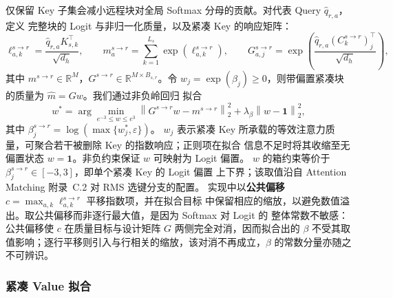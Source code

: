 \documentclass[sigconf,nonacm]{acmart}
\newcommand{\eps}{\varepsilon}
\begin{document}
仅保留 Key 子集会减小远程块对全局 Softmax 分母的贡献。对代表 Query $\widehat{q}_{r,a}$，定义
完整块的 Logit 与非归一化质量，以及紧凑 Key 的响应矩阵：
\begin{equation}
\ell_{a,k}^{s \to r} = \frac{\widehat{q}_{r,a} K_{s,k}^\top}{\sqrt{d_h}},\qquad
m_a^{s \to r} = \sum_{k=1}^{L_s} \exp\!\left(\ell_{a,k}^{s \to r}\right),\qquad
G_{a,j}^{s \to r} = \exp\!\left(\frac{\widehat{q}_{r,a} (C_k^{s \to r})_{j}^\top}{\sqrt{d_h}}\right),
\label{eq:mass-target}
\end{equation}
其中 $m^{s \to r} \in \mathbb{R}^{M}$，$G^{s \to r} \in \mathbb{R}^{M \times B_{s,r}}$。令
$w_j = \exp(\beta_j) \ge 0$，则带偏置紧凑块的质量为 $\widehat{m} = Gw$。我们通过非负岭回归
拟合
\begin{equation}
w^* = \arg\min_{e^{-3} \le w \le e^{3}} \left\|G^{s \to r} w - m^{s \to r}\right\|_2^2
      + \lambda_\beta \left\|w - \mathbf{1}\right\|_2^2,
\label{eq:beta-fit}
\end{equation}
其中 $\beta_j^{s \to r} = \log(\max\{w_j^*, \eps\})$。
$w_j$ 表示紧凑 Key 所承载的等效注意力质量，可聚合若干被删除 Key 的指数响应；正则项在拟合
信息不足时将其收缩至无偏置状态 $w = \mathbf{1}$。非负约束保证 $w$ 可映射为 Logit 偏置。
$w$ 的箱约束等价于 $\beta_j^{s \to r} \in [-3, 3]$，即单个紧凑 Key 的 Logit 偏置
上下界；该取值沿自 Attention Matching 附录~C.2 对 RMS 选键分支的配置。
实现中以\textbf{公共偏移} $c = \max_{a,k} \ell_{a,k}^{s \to r}$ 平移指数项，并在拟合目标
中保留相应的缩放，以避免数值溢出。取公共偏移而非逐行最大值，是因为 Softmax 对 Logit 的
整体常数不敏感：公共偏移使 $c$ 在质量目标与设计矩阵 $G$ 两侧完全对消，因而拟合出的 $\beta$
不受其取值影响；逐行平移则引入与行相关的缩放，该对消不再成立，$\beta$ 的常数分量亦随之
不可辨识。

\subsubsection{紧凑 Value 拟合}
\end{document}
